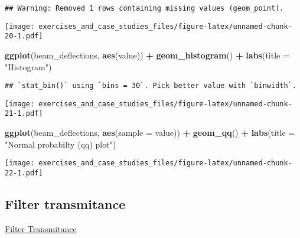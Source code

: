 \documentclass[]{book}
\newenvironment{Shaded}{\begin{snugshade}}{\end{snugshade}}
\newcommand{\DataTypeTok}[1]{\textcolor[rgb]{0.13,0.29,0.53}{#1}}
\newcommand{\DecValTok}[1]{\textcolor[rgb]{0.00,0.00,0.81}{#1}}
\newcommand{\KeywordTok}[1]{\textcolor[rgb]{0.13,0.29,0.53}{\textbf{#1}}}
\newcommand{\NormalTok}[1]{#1}
\newcommand{\OperatorTok}[1]{\textcolor[rgb]{0.81,0.36,0.00}{\textbf{#1}}}
\newcommand{\StringTok}[1]{\textcolor[rgb]{0.31,0.60,0.02}{#1}}
\theoremstyle{definition}
\theoremstyle{definition}
\theoremstyle{definition}
\theoremstyle{remark}
\begin{document}
\begin{verbatim}
## Warning: Removed 1 rows containing missing values (geom_point).
\end{verbatim}

\texttt{[image: exercises\_and\_case\_studies\_files/figure-latex/unnamed-chunk-20-1.pdf]}

\begin{Shaded}
\begin{Highlighting}[]
\KeywordTok{ggplot}\NormalTok{(beam_deflections, }\KeywordTok{aes}\NormalTok{(value)) }\OperatorTok{+}
\StringTok{  }\KeywordTok{geom_histogram}\NormalTok{() }\OperatorTok{+}
\StringTok{  }\KeywordTok{labs}\NormalTok{(}\DataTypeTok{title =} \StringTok{"Histogram"}\NormalTok{)}
\end{Highlighting}
\end{Shaded}

\begin{verbatim}
## `stat_bin()` using `bins = 30`. Pick better value with `binwidth`.
\end{verbatim}

\texttt{[image: exercises\_and\_case\_studies\_files/figure-latex/unnamed-chunk-21-1.pdf]}

\begin{Shaded}
\begin{Highlighting}[]
\KeywordTok{ggplot}\NormalTok{(beam_deflections, }\KeywordTok{aes}\NormalTok{(}\DataTypeTok{sample =}\NormalTok{ value)) }\OperatorTok{+}
\StringTok{  }\KeywordTok{geom_qq}\NormalTok{() }\OperatorTok{+}
\StringTok{  }\KeywordTok{labs}\NormalTok{(}\DataTypeTok{title =} \StringTok{"Normal probabilty (qq) plot"}\NormalTok{)}
\end{Highlighting}
\end{Shaded}

\texttt{[image: exercises\_and\_case\_studies\_files/figure-latex/unnamed-chunk-22-1.pdf]}

\hypertarget{filter-transmitance}{%
\subsection{Filter transmitance}\label{filter-transmitance}}

\href{https://www.itl.nist.gov/div898/handbook/eda/section4/eda426.htm}{Filter
Transmitance}

\begin{Shaded}
\end{Shaded}
\end{document}
